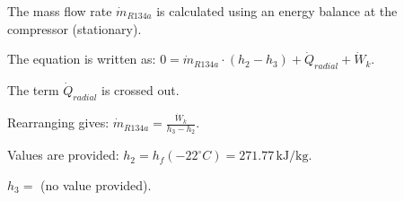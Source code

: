 The mass flow rate \( \dot{m}_{R134a} \) is calculated using an energy balance at the compressor (stationary).  

The equation is written as:  
\( 0 = \dot{m}_{R134a} \cdot (h_2 - h_3) + \dot{Q}_{radial} + \dot{W}_k \).  

The term \( \dot{Q}_{radial} \) is crossed out.  

Rearranging gives:  
\( \dot{m}_{R134a} = \frac{\dot{W}_k}{h_3 - h_2} \).  

Values are provided:  
\( h_2 = h_f (-22^\circ C) = 271.77 \, \text{kJ/kg} \).  

\( h_3 = \) (no value provided).